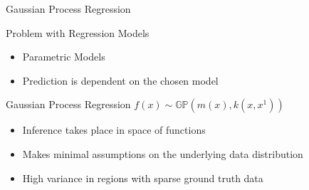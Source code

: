 \begin{frame}{Gaussian Process Regression}
\begin{block}{Problem with Regression Models}
\begin{itemize}
\item Parametric Models
\item Prediction is dependent on the chosen model
\end{itemize}
\end{block}
\begin{block}{Gaussian Process Regression}
$f(x) \sim \mathbb{GP}(m(x),k(x,x^1))$
\begin{itemize}
\item Inference takes place in space of functions
\item Makes minimal assumptions on the underlying data distribution
\item High variance in regions with sparse ground truth data
\end{itemize}
\end{block}
\end{frame}

%
